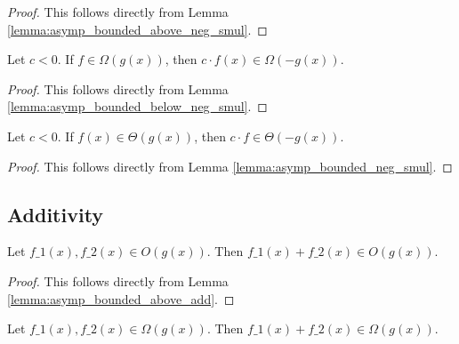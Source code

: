 \begin{proof}
    \leanok
    This follows directly from Lemma \ref{lemma:asymp_bounded_above_neg_smul}.
\end{proof}

\begin{lemma}
    \label{lemma:big_omega_neg_smul}
    \leanok
    Let $c < 0$. If $f \in \Omega(g(x))$, then $c \cdot f(x) \in \Omega(-g(x))$.
\end{lemma}

\begin{proof}
    \leanok
    This follows directly from Lemma \ref{lemma:asymp_bounded_below_neg_smul}.
\end{proof}

\begin{lemma}
    \label{lemma:theta_neg_smul}
    \leanok
    Let $c < 0$. If $f(x) \in \Theta(g(x))$, then $c \cdot f \in \Theta(-g(x))$.
\end{lemma}

\begin{proof}
    \leanok
    This follows directly from Lemma \ref{lemma:asymp_bounded_neg_smul}.
\end{proof}


\subsection{Additivity}

\begin{lemma}
    \label{lemma:big_o_add}
    \leanok
    Let $f\_1(x), f\_2(x) \in O(g(x))$. Then $f\_1(x) + f\_2(x) \in O(g(x))$.
\end{lemma}

\begin{proof}
    \leanok
    This follows directly from Lemma \ref{lemma:asymp_bounded_above_add}.
\end{proof}

\begin{lemma}
    \label{lemma:big_omega_add}
    \leanok
    Let $f\_1(x), f\_2(x) \in \Omega(g(x))$. Then $f\_1(x) + f\_2(x) \in \Omega(g(x))$.
\end{lemma}

